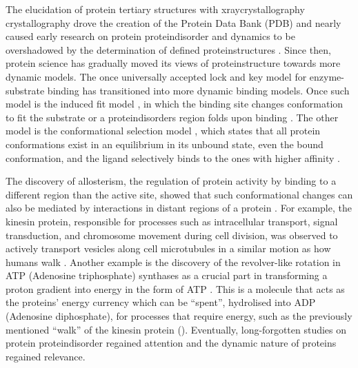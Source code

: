 The elucidation of protein tertiary structures with \gls{xraycrystallography} crystallography drove the creation of the Protein Data Bank (PDB) \cite{berman_protein_2012} and nearly caused early research on protein \gls{proteindisorder} and \gls{dynamics} \cite{pauling_theory_1940, jirgensons_classification_1966} to be overshadowed by the determination of defined \glspl{proteinstructure} \cite{bondos_roles_2021}. Since then, protein science has gradually moved its views of \gls{proteinstructure} towards more dynamic models. The once universally accepted lock and key model for enzyme-substrate binding \cite{fischer_einfluss_1894} has transitioned into more dynamic binding models. Once such model is the induced fit model \cite{koshland_application_1958, vasella_glycosidase_2002}, in which the binding site changes \gls{conformation} to fit the substrate or a \glspl{proteindisorder} region folds upon binding \cite{tsai_folding_1999, bonetti_analyzing_2017, delaforge_deciphering_2018, bonetti_how_2018, fuxreiter_fold_2019, robustelli_mechanism_2020}. The other model is the conformational selection model \cite{tsai_structured_2001}, which states that all protein \glspl{conformation} exist in an equilibrium in its unbound state, even the bound \gls{conformation}, and the \gls{ligand} selectively binds to the ones with higher affinity \cite{vogt_conformational_2013, vogt_essential_2014}. 

The discovery of allosterism, the regulation of protein activity by binding to a different region than the active site, showed that such conformational changes can also be mediated by interactions in distant regions of a protein \cite{monod_general_1961, monod_nature_1965}. For example, the kinesin protein, responsible for processes such as intracellular transport, signal transduction, and chromosome movement during cell division, was observed to actively transport vesicles along cell microtubules in a similar motion as how humans walk \cite{vale_molecular_2003, endow_kinesins_2010}. Another example is the discovery of the revolver-like rotation in ATP (Adenosine triphosphate) synthases as a crucial part in transforming a \gls{proton} gradient into energy in the form of ATP \cite{noji_direct_1997}. This is a molecule that acts as the proteins' energy currency which can be ``spent'', hydrolised into ADP (Adenosine diphosphate), for processes that require energy, such as the previously mentioned ``walk'' of the kinesin protein (). Eventually, long-forgotten studies on protein \gls{proteindisorder} regained attention and the dynamic nature of proteins regained relevance.

